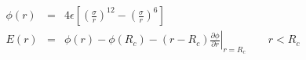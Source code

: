 


\begin{eqnarray*}
\phi\left(r\right) & = & 4 \epsilon \left[\left(\frac{\sigma}{r}\right)^{12} - \left(\frac{\sigma}{r}\right)^6\right] \\
E\left(r\right) & = & \phi\left(r\right)  - \phi\left(R_c\right) - \left(r - R_c\right) \left.\frac{\partial \phi}{\partial r} \right|_{r=R_c} \qquad r < R_c 
\end{eqnarray*}


